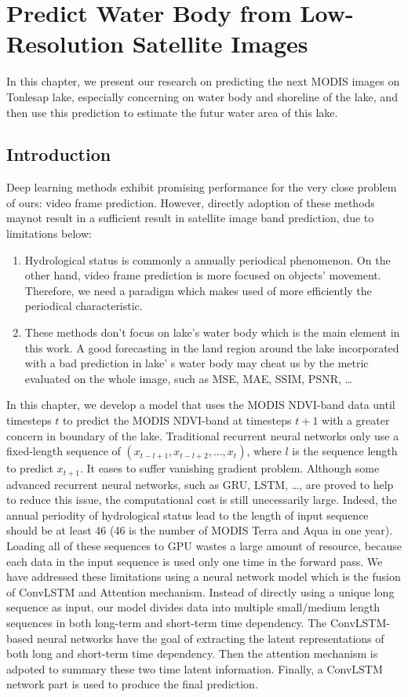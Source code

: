 \chapter{Predict Water Body from Low-Resolution Satellite Images}
\label{chap-4-predict-water-body}
\begin{ChapAbstract}
In this chapter, we present our research on predicting the next MODIS images on Tonlesap lake, especially concerning on water body and shoreline of the lake, and then use this prediction to estimate the futur water area of this lake.
\end{ChapAbstract}

\section{Introduction}
Deep learning methods exhibit promising performance for the very close problem of ours: video frame prediction. However, directly adoption of these methods maynot result in a sufficient result in satellite image band prediction, due to  limitations below:
\begin{enumerate} 
    \item Hydrological status is commonly a annually periodical phenomenon. On the other hand, video frame prediction is more focused on objects' movement. Therefore, we need a paradigm which makes used of more efficiently the periodical characteristic.
    \item These methods don't focus on lake's water body which is the main element in this work. A good forecasting in the land region around the lake incorporated with a bad prediction in lake' s water body may cheat us by the metric evaluated on the whole image, such as MSE, MAE, SSIM, PSNR, \dots 
\end{enumerate}
In this chapter, we develop a model that uses the MODIS NDVI-band data until timesteps $t$ to predict the MODIS NDVI-band at timesteps $t+1$ with a greater concern in boundary of the lake. Traditional recurrent neural networks only use a fixed-length sequence of $(x_{t - l + 1}, x_{t - l + 2},\dots,x_{t})$, where $l$ is the sequence length to predict $x_{t + 1}$. It eases to suffer vanishing gradient problem. Although some advanced recurrent neural networks, such as GRU, LSTM, \dots, are proved to help to reduce this issue, the computational cost is still unecessarily large. Indeed, the annual periodity of hydrological status lead to the length of input sequence should be at least 46 (46 is the number of MODIS Terra and Aqua in one year). Loading all of these sequences to GPU wastes a large amount of resource, because each data in the input sequence is used only one time in the forward pass. 
We have addressed these limitations using a neural network model which is the fusion of ConvLSTM and Attention mechanism. Instead of directly using a unique long sequence as input, our model divides data into multiple small/medium length sequences in both long-term and short-term time dependency. The ConvLSTM-based neural networks have the goal of extracting the latent representations of both long and short-term time dependency. Then the attention mechanism is adpoted to summary these two time latent information. Finally, a ConvLSTM network part is used to produce the final prediction.


